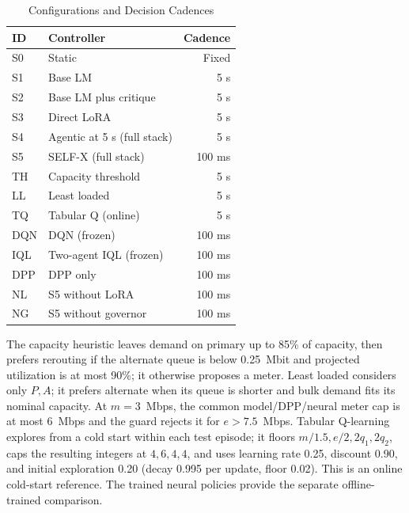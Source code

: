 \documentclass[conference]{IEEEtran}
\begin{document}
\begin{table}[t]
\centering
\caption{Configurations and Decision Cadences}
\label{tab:controllers}
\footnotesize
\begin{tabular}{@{}llr@{}}
\toprule
ID & Controller & Cadence \\
\midrule
S0 & Static & Fixed \\
S1 & Base LM & 5 s \\
S2 & Base LM plus critique & 5 s \\
S3 & Direct LoRA & 5 s \\
S4 & Agentic at 5 s (full stack) & 5 s \\
S5 & SELF-X (full stack) & 100 ms \\
TH & Capacity threshold & 5 s \\
LL & Least loaded & 5 s \\
TQ & Tabular Q (online) & 5 s \\
DQN & DQN (frozen) & 100 ms \\
IQL & Two-agent IQL (frozen) & 100 ms \\
DPP & DPP only & 100 ms \\
NL & S5 without LoRA & 100 ms \\
NG & S5 without governor & 100 ms \\
\bottomrule
\end{tabular}
\end{table}

The capacity heuristic leaves demand on primary up to 85\% of capacity, then prefers rerouting if the alternate queue is below 0.25~Mbit and projected utilization is at most 90\%; it otherwise proposes a meter. Least loaded considers only \(P,A\); it prefers alternate when its queue is shorter and bulk demand fits its nominal capacity. At \(m=3\)~Mbps, the common model/DPP/neural meter cap is at most 6~Mbps and the guard rejects it for \(e>7.5\)~Mbps. Tabular Q-learning explores from a cold start within each test episode; it floors \(m/1.5,e/2,2q_1,2q_2\), caps the resulting integers at \(4,6,4,4\), and uses learning rate 0.25, discount 0.90, and initial exploration 0.20 (decay 0.995 per update, floor 0.02). This is an online cold-start reference. The trained neural policies provide the separate offline-trained comparison.
\end{document}
